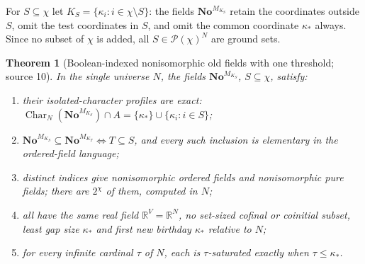 \documentclass[11pt,letterpaper]{article}
\numberwithin{equation}{section}
\newtheorem{theorem}{Theorem}[section]
\theoremstyle{definition}
\theoremstyle{remark}
\newcommand{\No}{\mathbf{No}}
\newcommand{\R}{\mathbb R}
\newcommand{\Pow}{\mathcal P}
\newcommand{\Char}{\operatorname{Char}}
\begin{document}
For $S\subseteq\chi$ let $K_S=\{\kappa_i:i\in\chi\setminus S\}$: the fields
$\No^{M_{K_S}}$ retain the coordinates outside $S$, omit the test coordinates in $S$, and
omit the common coordinate $\kappa_*$ always. Since no subset of $\chi$ is added, all
$S\in\Pow(\chi)^N$ are ground sets.

\begin{theorem}[Boolean-indexed nonisomorphic old fields with one threshold; source 10]\label{univ:gs:thm:booleanfamily}
In the single universe $N$, the fields $\No^{M_{K_S}}$, $S\subseteq\chi$, satisfy:
\begin{enumerate}[label=\textnormal{(\roman*)}]
\item their isolated-character profiles are exact:
$\Char_N(\No^{M_{K_S}})\cap A=\{\kappa_*\}\cup\{\kappa_i:i\in S\}$;
\item $\No^{M_{K_S}}\subseteq\No^{M_{K_T}}\iff T\subseteq S$, and every such inclusion is
elementary in the ordered-field language;
\item distinct indices give nonisomorphic ordered fields and nonisomorphic pure fields;
there are $2^\chi$ of them, computed in $N$;
\item all have the same real field $\R^V=\R^N$, no set-sized cofinal or coinitial subset,
least gap size $\kappa_*$ and first new birthday $\kappa_*$ relative to $N$;
\item for every infinite cardinal $\tau$ of $N$, each is $\tau$-saturated exactly when
$\tau\le\kappa_*$.
\end{enumerate}
\end{theorem}
\end{document}
